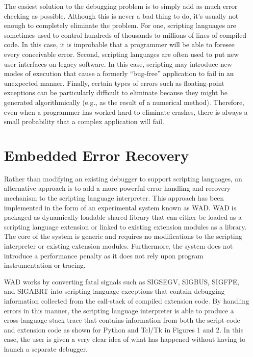 The easiest solution to the debugging problem is 
to simply add as much error checking as possible.  Although this is never
a bad thing to do, it's usually not enough to completely eliminate the problem.
For one, scripting languages are sometimes used to control hundreds
of thousands to millions of lines of compiled code.  In this case, it is improbable
that a programmer will be able to foresee every conceivable error.
Second, scripting languages are often used to put new user interfaces on legacy software. In this
case, scripting may introduce new modes of execution that cause a formerly ``bug-free''
application to fail in an unexpected manner.  Finally, certain types
of errors such as floating-point exceptions can be particularly
difficult to eliminate because they might be generated algorithmically (e.g.,
as the result of a numerical method). Therefore, even when a programmer has worked hard to eliminate
crashes, there is always a small probability that a complex application
will fail.

\section{Embedded Error Recovery}

Rather than modifying an existing debugger to support scripting
languages, an alternative approach is to add a more powerful error
handling and recovery mechanism to the scripting language interpreter.
This approach has been implemented in the form of an
experimental system known as WAD.  WAD
is packaged as dynamically loadable shared library that can either be
loaded as a scripting language extension or linked to existing
extension modules as a library.  The core of the system is generic and
requires no modifications to the scripting interpreter or existing
extension modules.  Furthermore, the system does not introduce a performance penalty as it
does not rely upon program instrumentation or tracing.

WAD works by converting fatal signals such as SIGSEGV,
SIGBUS, SIGFPE, and SIGABRT into scripting language exceptions that contain
debugging information collected from the call-stack of compiled
extension code.  By handling errors in this manner, the scripting
language interpreter is able to produce a cross-language stack trace that
contains information from both the script code and extension code as
shown for Python and Tcl/Tk in Figures 1 and 2.  In this case, the user
is given a very clear idea of what has happened without having
to launch a separate debugger. 

